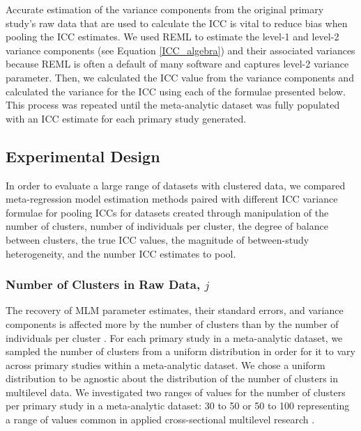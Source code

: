 Accurate estimation of the variance components from the original primary study's raw data that are used to calculate the ICC is vital to reduce bias when pooling the ICC estimates. We used REML to estimate the level-1 and level-2 variance components (see Equation \ref{ICC_algebra}) and their associated variances because REML is often a default of many software and captures level-2 variance parameter. Then, we calculated the ICC value from the variance components and calculated the variance for the ICC using each of the formulae presented below. This process was repeated until the meta-analytic dataset was fully populated with an ICC estimate for each primary study generated. 

\subsection{Experimental Design}
In order to evaluate a large range of datasets with clustered data, we compared meta-regression model estimation methods paired with different ICC variance formulae for pooling ICCs for datasets created through manipulation of the number of clusters, number of individuals per cluster, the degree of balance between clusters, the true ICC values,  the magnitude of between-study heterogeneity, and the number ICC estimates to pool. 

\subsubsection{Number of Clusters in Raw Data, \texorpdfstring{$j$}{j} }
The recovery of MLM parameter estimates, their standard errors, and variance components is affected more by the number of clusters than by the number of individuals per cluster \cite{chang2015, mok1995sample}. For each primary study in a meta-analytic dataset, we sampled the number of clusters from a uniform distribution in order for it to vary across primary studies within a meta-analytic dataset. We chose a uniform distribution to be agnostic about the distribution of the number of clusters in multilevel data. We investigated two ranges of values for the number of clusters per primary study in a meta-analytic dataset: 30 to 50 or 50 to 100 representing a range of values common in applied cross-sectional multilevel research \cite{hsu2017}. 


